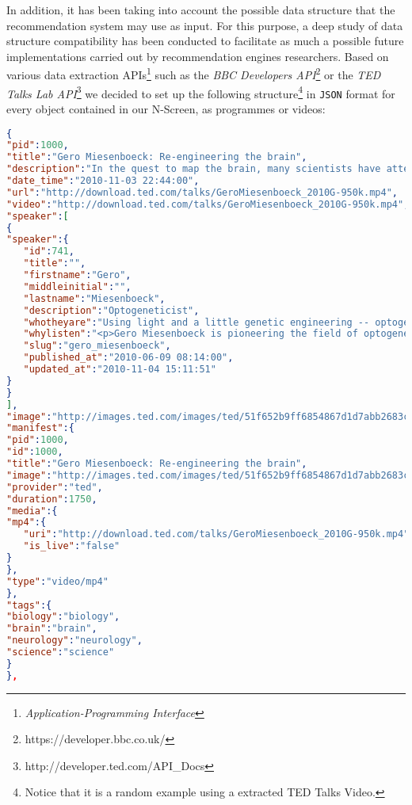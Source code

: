 \documentclass{acm_proc_article-sp}
\begin{document}
In addition, it has been taking into account the possible data structure that the recommendation system may use as input. For this purpose, a deep study of data structure compatibility has been conducted to facilitate as much a possible future implementations carried out by recommendation engines researchers. Based on various data extraction APIs\footnote{\textit{Application-Programming Interface}} such as the \textit{BBC Developers API}\footnote{https://developer.bbc.co.uk/} or the \textit{TED Talks Lab API}\footnote{http://developer.ted.com/API\_Docs}
we decided to set up the following structure\footnote{Notice that it is a random example using a extracted TED Talks Video.} in \texttt{JSON} format for every object contained in our N-Screen, as programmes or videos:
\begin{lstlisting}[language=json,firstnumber=1]
{
"pid":1000,
"title":"Gero Miesenboeck: Re-engineering the brain",
"description":"In the quest to map the brain, many scientists have attempted the incredibly daunting task of recording the activity of each neuron. Gero Miesenboeck works backward -- manipulating specific neurons to figure out exactly what they do, through a series of stunning experiments that reengineer the way fruit flies percieve light.",
"date_time":"2010-11-03 22:44:00",
"url":"http://download.ted.com/talks/GeroMiesenboeck_2010G-950k.mp4",
"video":"http://download.ted.com/talks/GeroMiesenboeck_2010G-950k.mp4",
"speaker":[
{
"speaker":{
   "id":741,
   "title":"",
   "firstname":"Gero",
   "middleinitial":"",
   "lastname":"Miesenboeck",
   "description":"Optogeneticist",
   "whotheyare":"Using light and a little genetic engineering -- optogenetics -- Gero Miesenboeck has developed a way to control how living nerve cells work, and advanced understanding of how the brain controls behavior.",
   "whylisten":"<p>Gero Miesenboeck is pioneering the field of optogenetics: genetically modifying nerve cells to respond to light. By flashing light at a modified neuron in a living nervous system, Miesenboeck and his collaborators can mimic a brain impulse -- and then study what happens next. Optogenetics will allow ever more precise experiments on living brains, allowing us to gather better evidence on how electrical impulses on tissue translate into actual behavior and thoughts...</p>",
   "slug":"gero_miesenboeck",
   "published_at":"2010-06-09 08:14:00",
   "updated_at":"2010-11-04 15:11:51"
}
}
],
"image":"http://images.ted.com/images/ted/51f652b9ff6854867d1d7abb2683caf1d8dd22fb_240x180.jpg",
"manifest":{
"pid":1000,
"id":1000,
"title":"Gero Miesenboeck: Re-engineering the brain",
"image":"http://images.ted.com/images/ted/51f652b9ff6854867d1d7abb2683caf1d8dd22fb_240x180.jpg",
"provider":"ted",
"duration":1750,
"media":{
"mp4":{
   "uri":"http://download.ted.com/talks/GeroMiesenboeck_2010G-950k.mp4",
   "is_live":"false"
}
},
"type":"video/mp4"
},
"tags":{
"biology":"biology",
"brain":"brain",
"neurology":"neurology",
"science":"science"
}
},
\end{lstlisting}
\end{document}
